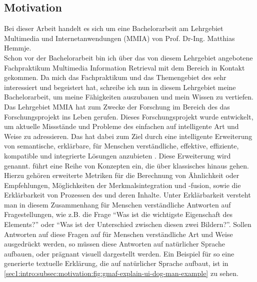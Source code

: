 \subsection{Motivation}
\label{sec1:intro:subsec:motivation}
Bei dieser Arbeit handelt es sich um eine Bachelorarbeit am Lehrgebiet Multimedia und Internetanwendungen (MMIA) von Prof. Dr-Ing. Matthias Hemmje.
\\[\baselineskip]
Schon vor der Bachelorarbeit bin ich über das von diesem Lehrgebiet angebotene Fachpraktikum Multimedia Information Retrieval mit dem Bereich \mmir{} in Kontakt gekommen. 
Da mich das Fachpraktikum und das Themengebiet des \mmir{} sehr interessiert und begeistert hat, schreibe ich nun in diesem Lehrgebiet meine Bachelorarbeit, um meine Fähigkeiten auszubauen und mein Wissen zu vertiefen.
\med
Das Lehrgebiet MMIA hat zum Zwecke der Forschung im Bereich des \mmir{} das Forschungsprojekt \gmafi{} ins Leben gerufen. 
Dieses Forschungsprojekt wurde entwickelt, um aktuelle Missstände und Probleme des einfachen \mmir{} auf intelligente Art und Weise zu adressieren. 
Das \gmaf{} hat dabei zum Ziel durch eine intelligente Erweiterung von \mmir{} semantische, erklärbare, für Menschen verständliche, effektive, effiziente, kompatible und integrierte Lösungen anzubieten \cite[S.~20]{swa_diss}.
Diese Erweiterung wird \smmiri{} genannt.
\smmir{} führt eine Reihe von Konzepten ein, die über klassisches \mmir{} hinaus gehen.
Hierzu gehören erweiterte Metriken für die Berechnung von Ähnlichkeit oder Empfehlungen, Möglichkeiten der Merkmalsintegration und -fusion, sowie die Erklärbarkeit von Prozessen des \mmir{} und deren Inhalte.
Unter Erklärbarkeit versteht man in diesem Zusammenhang für Menschen verständliche Antworten auf Fragestellungen, wie z.B. die Frage \enquote{Was ist die wichtigste Eigenschaft des Elements?} oder \enquote{Was ist der Unterschied zwischen diesen zwei Bildern?}.
Sollen Antworten auf diese Fragen auf für Menschen verständliche Art und Weise ausgedrückt werden, so müssen diese Antworten auf natürlicher Sprache aufbauen, oder prägnant visuell dargestellt werden.
Ein Beispiel für so eine generierte textuelle Erklärung, die auf natürlicher Sprache aufbaut, ist in \cref{sec1:intro:subsec:motivation:fig:gmaf-explain-ui-dog-man-example} zu sehen. 
